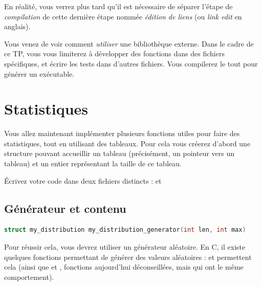 \documentclass[11pt,a4paper]{article}
\begin{document}
\bigskip

En réalité, vous verrez plus tard qu'il est nécessaire de séparer l'étape de \textit{compilation} de cette dernière étape nommée \textit{édition de liens} (ou \textit{link edit} en anglais).

\bigskip

Vous venez de voir comment \textit{utiliser} une bibliothèque externe.
Dans le cadre de ce TP, vous vous limiterez à développer des fonctions dans des fichiers spécifiques, et écrire les tests dans d'autres fichiers.
Vous compilerez le tout pour générer un exécutable.


\newpage


\section{Statistiques}

\medskip

Vous allez maintenant implémenter plusieurs fonctions utiles pour faire des statistiques, tout en utilisant des tableaux.
Pour cela vous créerez d'abord une structure  pouvant accueillir un tableau (précisément, un pointeur vers un tableau) et un entier représentant la taille de ce tableau.

\'Ecrivez votre code dans deux fichiers distincts :  et 


\subsection{Générateur et contenu}


\begin{lstlisting}[language=C,morekeywords={floor,ceil}]
struct my_distribution my_distribution_generator(int len, int max) \end{lstlisting}

Pour réussir cela, vous devrez utiliser un générateur aléatoire.
En C, il existe quelques fonctions permettant de générer des valeurs aléatoires :  et  permettent cela (ainsi que  et , fonctions aujourd'hui déconseillées, mais qui ont le même comportement).

\bigskip
\end{document}
